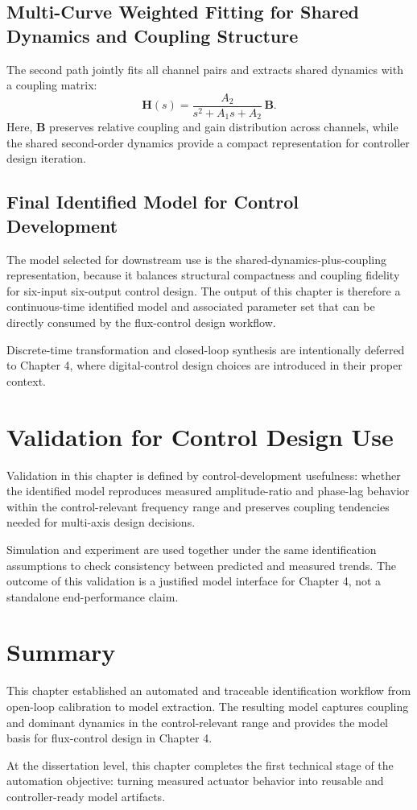 \subsection{Multi-Curve Weighted Fitting for Shared Dynamics and Coupling Structure}

The second path jointly fits all channel pairs and extracts shared dynamics with a coupling matrix:
\begin{equation}
\mathbf{H}(s) = \frac{A_{2}}{s^{2} + A_{1}s + A_{2}}\,\mathbf{B}.
\end{equation}
Here, $\mathbf{B}$ preserves relative coupling and gain distribution across channels, while the shared second-order dynamics provide a compact representation for controller design iteration.

\subsection{Final Identified Model for Control Development}

The model selected for downstream use is the shared-dynamics-plus-coupling representation, because it balances structural compactness and coupling fidelity for six-input six-output control design. The output of this chapter is therefore a continuous-time identified model and associated parameter set that can be directly consumed by the flux-control design workflow.

Discrete-time transformation and closed-loop synthesis are intentionally deferred to Chapter 4, where digital-control design choices are introduced in their proper context.

\section{Validation for Control Design Use}

Validation in this chapter is defined by control-development usefulness: whether the identified model reproduces measured amplitude-ratio and phase-lag behavior within the control-relevant frequency range and preserves coupling tendencies needed for multi-axis design decisions.

Simulation and experiment are used together under the same identification assumptions to check consistency between predicted and measured trends. The outcome of this validation is a justified model interface for Chapter 4, not a standalone end-performance claim.

\section{Summary}

This chapter established an automated and traceable identification workflow from open-loop calibration to model extraction. The resulting model captures coupling and dominant dynamics in the control-relevant range and provides the model basis for flux-control design in Chapter 4.

At the dissertation level, this chapter completes the first technical stage of the automation objective: turning measured actuator behavior into reusable and controller-ready model artifacts.
